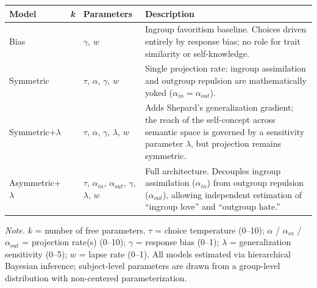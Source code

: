 \documentclass[
  man,
  longtable,
  nolmodern,
  notxfonts,
  notimes,
  man]{apa7}
\begin{document}
\begin{longtable}[]{@{}
  >{\raggedright\arraybackslash}p{}
  >{\centering\arraybackslash}p{}
  >{\raggedright\arraybackslash}p{}
  >{\raggedright\arraybackslash}p{}@{}}
\toprule\noalign{}
\begin{minipage}[b]{\linewidth}\raggedright
Model
\end{minipage} & \begin{minipage}[b]{\linewidth}\centering
\emph{k}
\end{minipage} & \begin{minipage}[b]{\linewidth}\raggedright
Parameters
\end{minipage} & \begin{minipage}[b]{\linewidth}\raggedright
Description
\end{minipage} \\
\midrule\noalign{}
\endhead
\bottomrule\noalign{}
\endlastfoot
Bias & 2 & \(\gamma\), \(w\) & Ingroup favoritism baseline. Choices
driven entirely by response bias; no role for trait similarity or
self-knowledge. \\
Symmetric & 4 & \(\tau\), \(\alpha\), \(\gamma\), \(w\) & Single
projection rate; ingroup assimilation and outgroup repulsion are
mathematically yoked (\(\alpha_{in} = \alpha_{out}\)). \\
Symmetric+\(\lambda\) & 5 & \(\tau\), \(\alpha\), \(\gamma\),
\(\lambda\), \(w\) & Adds Shepard's generalization gradient; the reach
of the self-concept across semantic space is governed by a sensitivity
parameter \(\lambda\), but projection remains symmetric. \\
Asymmetric+\(\lambda\) & 6 & \(\tau\), \(\alpha_{in}\),
\(\alpha_{out}\), \(\gamma\), \(\lambda\), \(w\) & Full architecture.
Decouples ingroup assimilation (\(\alpha_{in}\)) from outgroup repulsion
(\(\alpha_{out}\)), allowing independent estimation of ``ingroup love''
and ``outgroup hate.'' \\
\end{longtable}

\emph{Note.} \(k\) = number of free parameters. \(\tau\) = choice
temperature (0--10); \(\alpha\) / \(\alpha_{in}\) / \(\alpha_{out}\) =
projection rate(s) (0--10); \(\gamma\) = response bias (0--1);
\(\lambda\) = generalization sensitivity (0--5); \(w\) = lapse rate
(0--1). All models estimated via hierarchical Bayesian inference;
subject-level parameters are drawn from a group-level distribution with
non-centered parameterization.
\end{document}
